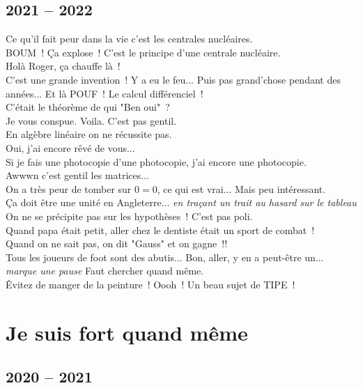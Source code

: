 \documentclass[french, a4paper, openany]{book}
\begin{document}
	\subsection*{2021 -- 2022}

	\noindent \og Ce qu'il fait peur dans la vie c'est les centrales nucléaires. \fg \\
	\og BOUM~! Ça explose~! C'est le principe d'une centrale nucléaire. \fg \\
	\og Holà Roger, ça chauffe là~! \fg \\
	\og C'est une grande invention~! Y a eu le feu... Puis pas grand'chose pendant des années... Et là POUF~! Le calcul différenciel~! \fg \\
	\og C'était le théorème de qui "Ben oui"~? \fg \\
	\og Je vous conspue. Voila. C'est pas gentil. \fg \\
	\og En algèbre linéaire on ne récussite pas. \fg \\
	\og Oui, j'ai encore rêvé de vous... \fg \\
	\og Si je fais une photocopie d'une photocopie, j'ai encore une photocopie. \fg \\
	\og Awwwn c'est gentil les matrices... \fg \\
	\og On a très peur de tomber sur $0 = 0$, ce qui est vrai... Mais peu intéressant. \fg \\
	\og Ça doit être une unité en Angleterre... \fg \emph{en traçant un trait au hasard sur le tableau} \\
	\og On ne se précipite pas sur les hypothèses~! C'est pas poli. \fg \\
	\og Quand papa était petit, aller chez le dentiste était un sport de combat~! \fg \\
	\og Quand on ne sait pas, on dit "Gauss" et on gagne~!! \fg \\
	\og Tous les joueurs de foot sont des abutis... Bon, aller, y en a peut-être un... \emph{marque une pause} Faut chercher quand même. \fg \\
	\og Êvitez de manger de la peinture~! Oooh~! Un beau sujet de TIPE~! \fg \\

\section*{Je suis fort quand même}

	\subsection*{2020 -- 2021}
\end{document}
